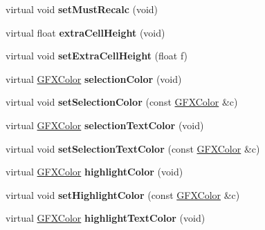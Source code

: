 \begin{DoxyCompactItemize}
\item 
virtual void {\bfseries set\+Must\+Recalc} (void)\hypertarget{classPicker_a892c2ddc7d408b4d9979529513e7bea7}{}\label{classPicker_a892c2ddc7d408b4d9979529513e7bea7}

\item 
virtual float {\bfseries extra\+Cell\+Height} (void)\hypertarget{classPicker_a3ced8cb4e7b7de52e528f7ca11aacdab}{}\label{classPicker_a3ced8cb4e7b7de52e528f7ca11aacdab}

\item 
virtual void {\bfseries set\+Extra\+Cell\+Height} (float f)\hypertarget{classPicker_a48c7884882332d16e7ad49c062fa70cd}{}\label{classPicker_a48c7884882332d16e7ad49c062fa70cd}

\item 
virtual \hyperlink{structGFXColor}{G\+F\+X\+Color} {\bfseries selection\+Color} (void)\hypertarget{classPicker_a05c80dd0a41e9f5319cca1df1cd1ec2d}{}\label{classPicker_a05c80dd0a41e9f5319cca1df1cd1ec2d}

\item 
virtual void {\bfseries set\+Selection\+Color} (const \hyperlink{structGFXColor}{G\+F\+X\+Color} \&c)\hypertarget{classPicker_a0631229043589103bf2ecb539f565e47}{}\label{classPicker_a0631229043589103bf2ecb539f565e47}

\item 
virtual \hyperlink{structGFXColor}{G\+F\+X\+Color} {\bfseries selection\+Text\+Color} (void)\hypertarget{classPicker_a438e921a7f3d9d74c481988aa601c924}{}\label{classPicker_a438e921a7f3d9d74c481988aa601c924}

\item 
virtual void {\bfseries set\+Selection\+Text\+Color} (const \hyperlink{structGFXColor}{G\+F\+X\+Color} \&c)\hypertarget{classPicker_a2d56c1cd2073315266006a393f3f6ab0}{}\label{classPicker_a2d56c1cd2073315266006a393f3f6ab0}

\item 
virtual \hyperlink{structGFXColor}{G\+F\+X\+Color} {\bfseries highlight\+Color} (void)\hypertarget{classPicker_ab4f57d07d6af9b4cb1765a1b24cb0bf7}{}\label{classPicker_ab4f57d07d6af9b4cb1765a1b24cb0bf7}

\item 
virtual void {\bfseries set\+Highlight\+Color} (const \hyperlink{structGFXColor}{G\+F\+X\+Color} \&c)\hypertarget{classPicker_a5c7da5cdd7b7b3961c7bc2c90706468e}{}\label{classPicker_a5c7da5cdd7b7b3961c7bc2c90706468e}

\item 
virtual \hyperlink{structGFXColor}{G\+F\+X\+Color} {\bfseries highlight\+Text\+Color} (void)\hypertarget{classPicker_a4d3bfe6e658320d2a3277423fcef91f1}{}\label{classPicker_a4d3bfe6e658320d2a3277423fcef91f1}


\end{DoxyCompactItemize}
